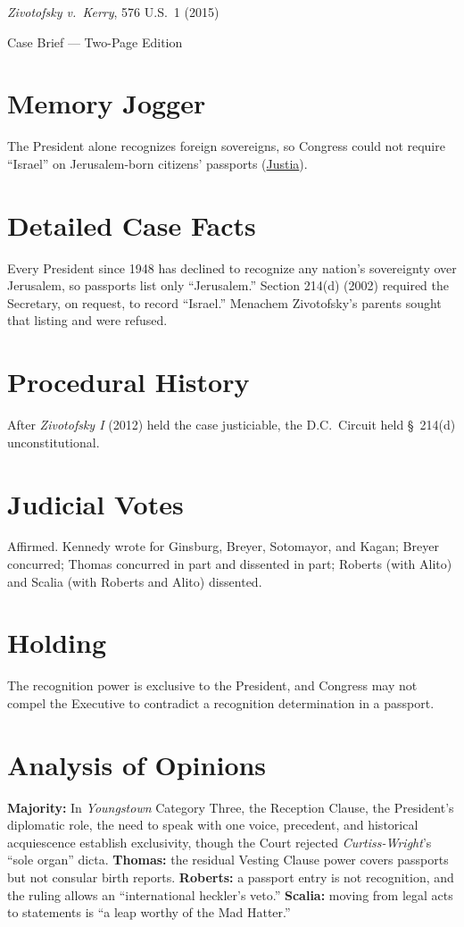 \documentclass[12pt]{article}
\begin{document}
\begin{center}
{\LARGE \textit{Zivotofsky v.\ Kerry}, 576 U.S.\ 1 (2015)\par}
\vspace{0.5em}
{\large Case Brief --- Two-Page Edition\par}
\end{center}

\section{Memory Jogger}
The President alone recognizes foreign sovereigns, so Congress could not require ``Israel'' on Jerusalem-born citizens' passports (\href{https://supreme.justia.com/cases/federal/us/576/1/}{Justia}).

\section{Detailed Case Facts}
Every President since 1948 has declined to recognize any nation's sovereignty over Jerusalem, so passports list only ``Jerusalem.'' Section 214(d) (2002) required the Secretary, on request, to record ``Israel.'' Menachem Zivotofsky's parents sought that listing and were refused.

\section{Procedural History}
After \textit{Zivotofsky I} (2012) held the case justiciable, the D.C.\ Circuit held \S~214(d) unconstitutional.

\section{Judicial Votes}
Affirmed. Kennedy wrote for Ginsburg, Breyer, Sotomayor, and Kagan; Breyer concurred; Thomas concurred in part and dissented in part; Roberts (with Alito) and Scalia (with Roberts and Alito) dissented.

\section{Holding}
The recognition power is exclusive to the President, and Congress may not compel the Executive to contradict a recognition determination in a passport.

\section{Analysis of Opinions}
\textbf{Majority:} In \textit{Youngstown} Category Three, the Reception Clause, the President's diplomatic role, the need to speak with one voice, precedent, and historical acquiescence establish exclusivity, though the Court rejected \textit{Curtiss-Wright}'s ``sole organ'' dicta. \textbf{Thomas:} the residual Vesting Clause power covers passports but not consular birth reports. \textbf{Roberts:} a passport entry is not recognition, and the ruling allows an ``international heckler's veto.'' \textbf{Scalia:} moving from legal acts to statements is ``a leap worthy of the Mad Hatter.''
\end{document}
